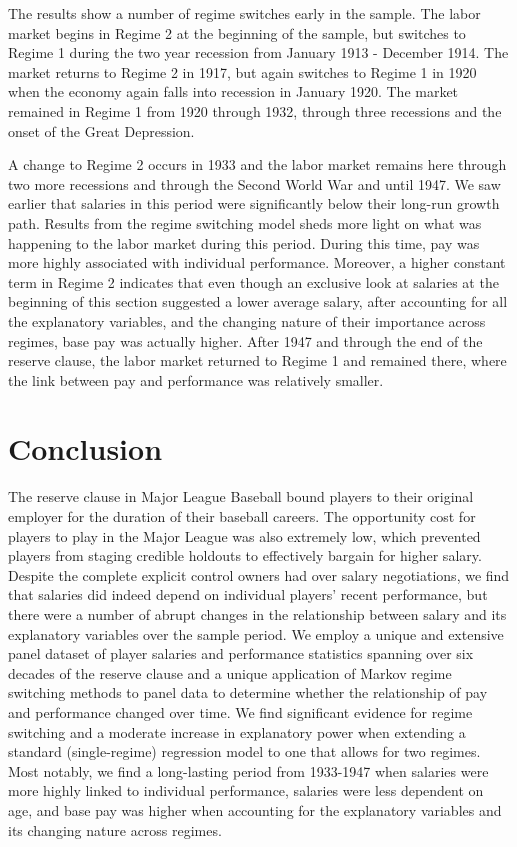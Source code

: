 \documentclass[12pt]{article}
\begin{document}
The results show a number of regime switches early in the sample.  The labor market begins in Regime 2 at the beginning of the sample, but switches to Regime 1 during the two year recession from January 1913 - December 1914.  The market returns to Regime 2 in 1917, but again switches to Regime 1 in 1920 when the economy again falls into recession in January 1920.  The market remained in Regime 1 from 1920 through 1932, through three recessions and the onset of the Great Depression.

A change to Regime 2 occurs in 1933 and the labor market remains here through two more recessions and through the Second World War and until 1947.  We saw earlier that salaries in this period were significantly below their long-run growth path.  Results from the regime switching model sheds more light on what was happening to the labor market during this period.  During this time, pay was more highly associated with individual performance.  Moreover, a higher constant term in Regime 2 indicates that even though an exclusive look at salaries at the beginning of this section suggested a lower average salary, after accounting for all the explanatory variables, and the changing nature of their importance across regimes, base pay was actually higher.   After 1947 and through the end of the reserve clause, the labor market returned to Regime 1 and remained there, where the link between pay and performance was relatively smaller. 

\section{Conclusion}
The reserve clause in Major League Baseball bound players to their original employer for the duration of their baseball careers.  The opportunity cost for players to play in the Major League was also extremely low, which prevented players from staging credible holdouts to effectively bargain for higher salary.  Despite the complete explicit control owners had over salary negotiations, we find that salaries did indeed depend on individual players' recent performance, but there were a number of abrupt changes in the relationship between salary and its explanatory variables over the sample period.  We employ a unique and extensive panel dataset of player salaries and performance statistics spanning over six decades of the reserve clause and a unique application of Markov regime switching methods to panel data to determine whether the relationship of pay and performance changed over time.  We find significant evidence for regime switching and a moderate increase in explanatory power when extending a standard (single-regime) regression model to one that allows for two regimes.  Most notably, we find a long-lasting period from 1933-1947 when salaries were more highly linked to individual performance, salaries were less dependent on age, and base pay was higher when accounting for the explanatory variables and its changing nature across regimes.  
\end{document}
